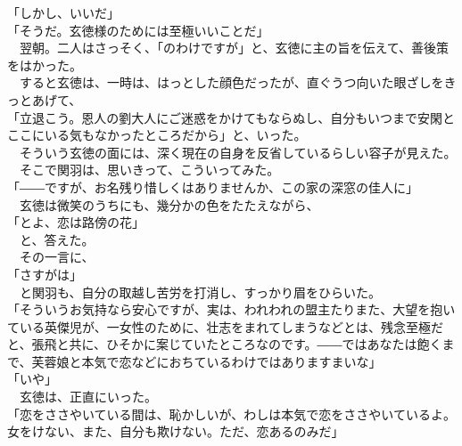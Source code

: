 \documentclass[
  paper=a5,
  fontsize=10pt,
  jafontsize=9.5pt,
  tate,                  %
  open_bracket_pos=nibu, %
]{jlreq}
\begin{document}
「しかし、いいだ」\\


「そうだ。玄徳様のためには至極いいことだ」\\


　翌朝。二人はさっそく、「のわけですが」と、玄徳に主の旨を伝えて、善後策をはかった。\\


　すると玄徳は、一時は、はっとした顔色だったが、直ぐうつ向いた眼ざしをきっとあげて、\\


「立退こう。恩人の劉大人にご迷惑をかけてもならぬし、自分もいつまで安閑とここにいる気もなかったところだから」と、いった。\\


　そういう玄徳の面には、深く現在の自身を反省しているらしい容子が見えた。\\


　そこで関羽は、思いきって、こういってみた。\\


「――ですが、お名残り惜しくはありませんか、この家の深窓の佳人に」\\


　玄徳は微笑のうちにも、幾分かの色をたたえながら、\\


「とよ、恋は路傍の花」\\


　と、答えた。\\


　その一言に、\\


「さすがは」\\


　と関羽も、自分の取越し苦労を打消し、すっかり眉をひらいた。\\


「そういうお気持なら安心ですが、実は、われわれの盟主たりまた、大望を抱いている英傑児が、一女性のために、壮志をまれてしまうなどとは、残念至極だと、張飛と共に、ひそかに案じていたところなのです。――ではあなたは飽くまで、芙蓉娘と本気で恋などにおちているわけではありますまいな」\\


「いや」\\


　玄徳は、正直にいった。\\


「恋をささやいている間は、恥かしいが、わしは本気で恋をささやいているよ。女をけない、また、自分も欺けない。ただ、恋あるのみだ」\\
\end{document}

